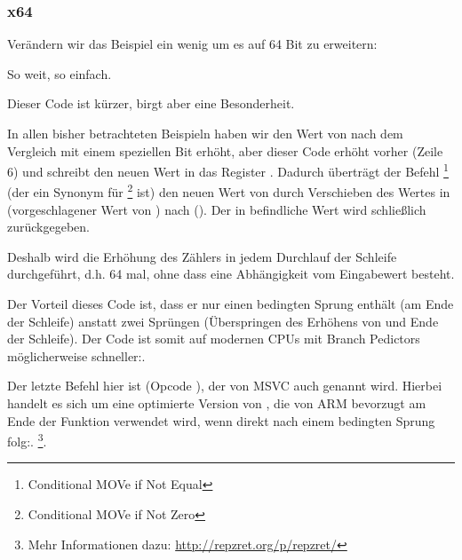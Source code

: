 \subsubsection{x64}
\label{subsec:popcnt}
Verändern wir das Beispiel ein wenig um es auf 64 Bit zu erweitern:




So weit, so einfach.





Dieser Code ist kürzer, birgt aber eine Besonderheit.

In allen bisher betrachteten Beispieln haben wir den Wert von  nach dem
Vergleich mit einem speziellen Bit erhöht, aber dieser Code erhöht  vorher
(Zeile 6) und schreibt den neuen Wert in das Register \EDX.
Dadurch überträgt der Befehl \CMOVNE\footnote{Conditional MOVe if Not Equal}
(der ein Synonym für \CMOVNZ\footnote{Conditional MOVe if Not Zero} ist) den
neuen Wert von  durch Verschieben des Wertes in \EDX (vorgeschlagener
Wert von ) nach \EAX (). Der in \EAX befindliche
Wert wird schließlich zurückgegeben.

Deshalb wird die Erhöhung des Zählers in jedem Durchlauf der Schleife
durchgeführt, d.h. 64 mal, ohne dass eine Abhängigkeit vom Eingabewert
besteht.

Der Vorteil dieses Code ist, dass er nur einen bedingten Sprung enthält (am
Ende der Schleife) anstatt zwei Sprüngen (Überspringen des Erhöhens von 
und Ende der Schleife). 
Der Code ist somit auf modernen CPUs mit Branch Pedictors möglicherweise
schneller:.

\label{FATRET}
Der letzte Befehl hier ist  (Opcode ), der von MSVC auch
 genannt wird.
Hierbei handelt es sich um eine optimierte Version von \RET, die von ARM
bevorzugt am Ende der Funktion verwendet wird, wenn \RET direkt nach einem
bedingten Sprung folg:.
\footnote{Mehr Informationen dazu: \url{http://repzret.org/p/repzret/}}.

